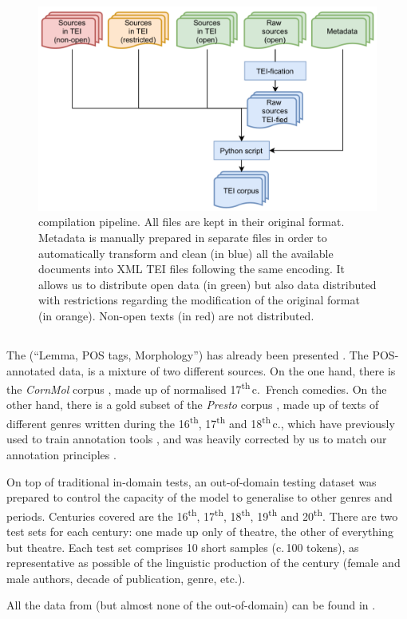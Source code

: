 \begin{figure}[ht]
    \centering
    \includegraphics[width=0.75\linewidth]{static/media/mod_eval/dalembert/corpus_trans.png}
    \caption{\freemmax compilation pipeline. All files are kept in their original format. Metadata is manually prepared in separate files in order to automatically transform and clean (in blue) all the available documents into XML TEI files following the same encoding. It allows us to distribute open data (in green) but also data distributed with restrictions regarding the modification of the original format (in orange). Non-open texts (in red) are not distributed.}
    \label{fig:pipeline}
\end{figure}

\subsection{\texorpdfstring{\freemlpm}{FREEM LPM}}\label{freem_lpm}

The \freemlpm (``Lemma, POS tags, Morphology'') has already been presented \cite{gabay-etal-2020-standardizing}. The POS-annotated data, is a mixture of two different sources. On the one hand, there is the \emph{CornMol} corpus \cite{camps-etal-2021-corpus}, made up of normalised 17\textsuperscript{th}\,c.~French comedies. On the other hand, there is a gold subset of the \emph{Presto} corpus \cite{blumenthal-etal-2017-presto}, made up of texts of different genres written during the 16\textsuperscript{th}, 17\textsuperscript{th} and 18\textsuperscript{th}\,c., which have previously used to train annotation tools \cite{diwersy-etal-2017-ressources}, and was heavily corrected by us to match our annotation principles \cite{gabay-etal-2020-manuel}.

On top of traditional in-domain tests, an out-of-domain testing dataset was prepared to control the capacity of the model to generalise to other genres and periods. Centuries covered are the 16\textsuperscript{th}, 17\textsuperscript{th}, 18\textsuperscript{th}, 19\textsuperscript{th} and 20\textsuperscript{th}. There are two test sets for each century: one made up only of theatre, the other of everything but theatre. Each test set comprises 10 short samples (c.\,100 tokens), as representative as possible of the linguistic production of the century (female and male authors, decade of publication, genre, etc.).

All the data from \freemlpm (but almost none of the out-of-domain) can be found in \freemmax.
